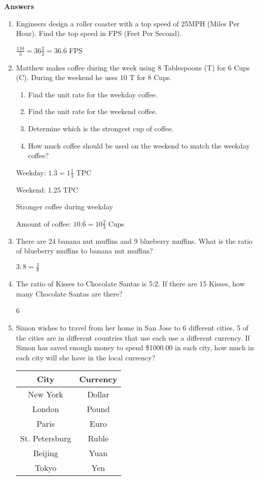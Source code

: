 \documentclass[12pt]{article}
\begin{document}
\large

\textbf{ Answers }

\begin{enumerate}
\item Engineers design a roller coaster with a top speed of 25MPH (Miles Per Hour).  Find the top speed in FPS (Feet Per Second).

	\( \frac{110}{3} = 36\frac{2}{3} = 36.\overline{6} \) FPS

\item Matthew makes coffee during the week using 8 Tablespoons (T) for 6 Cups (C).  During the weekend he uses 10 T for 8 Cups.
	\begin{enumerate}
		\item Find the unit rate for the weekday coffee.
		\item Find the unit rate for the weekend coffee.
		\item Determine which is the strongest cup of coffee.
		\item How much coffee should be used on the weekend to match the weekday coffee?
	\end{enumerate}

	Weekday: \( 1.\overline{3} = 1\frac{1}{3} \) TPC

	Weekend: 1.25 TPC

	Stronger coffee during weekday

	Amount of coffee: \( 10.\overline{6} = 10\frac{2}{3} \) Cups

\item There are 24 banana nut muffins and 9 blueberry muffins.  What is the ratio of blueberry muffins to banana nut muffins?

	\( 3:8 = \frac{3}{8} \)

\item The ratio of Kisses to Chocolate Santas is 5:2.  If there are 15 Kisses, how many Chocolate Santas are there?

	6

\item Simon wishes to travel from her home in San Jose to 6 different cities.  5 of the cities are in different countries that use each use a different currency.  If Simon has saved enough money to spend \$1000.00 in each city, how much in each city will she have in the local currency?

	\begin{tabular}{ | c | c | }
	\hline
	\bf{City} & \bf{Currency} \\ \hline \hline
	New York & Dollar \\ \hline
	London & Pound \\ \hline
	Paris & Euro \\ \hline
	St. Petersburg & Ruble \\ \hline
	Beijing & Yuan \\ \hline
	Tokyo & Yen \\ \hline
	\hline
	\end{tabular}


\end{enumerate}
\end{document}

